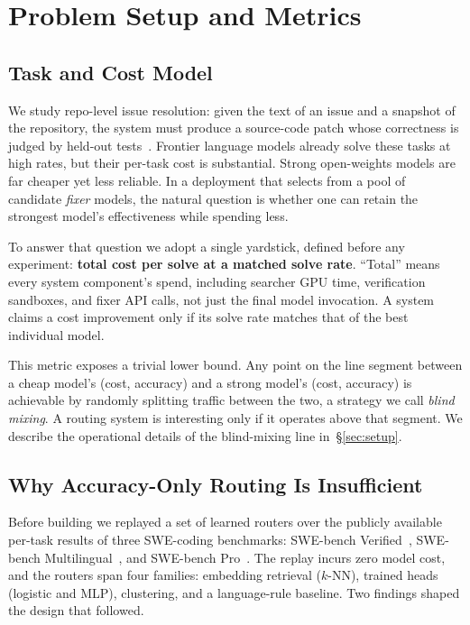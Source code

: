 \section{Problem Setup and Metrics}
\label{sec:problem}

\subsection{Task and Cost Model}
\label{sec:problem:task}

We study repo-level issue resolution: given the text of an issue and a
snapshot of the repository, the system must produce a source-code patch
whose correctness is judged by held-out tests~\citep{swebench,swebenchpro}.
Frontier language models already solve these tasks at high rates, but their
per-task cost is substantial.  Strong open-weights models are far cheaper
yet less reliable.  In a deployment that selects from a pool of candidate
\emph{fixer} models, the natural question is whether one can retain the
strongest model's effectiveness while spending less.

To answer that question we adopt a single yardstick, defined before any
experiment: \textbf{total cost per solve at a matched solve rate}.
``Total'' means every system component's spend, including searcher GPU
time, verification sandboxes, and fixer API calls, not just the final
model invocation.  A system claims a cost improvement only if its solve
rate matches that of the best individual model.

This metric exposes a trivial lower bound.  Any point on the line segment
between a cheap model's (cost, accuracy) and a strong model's (cost,
accuracy) is achievable by randomly splitting traffic between the two, a
strategy we call \emph{blind mixing}.  A routing system is interesting
only if it operates above that segment.  We describe the operational
details of the blind-mixing line in~\S\ref{sec:setup}.

\subsection{Why Accuracy-Only Routing Is Insufficient}
\label{sec:problem:audit}

Before building \sysname we replayed a set of learned routers over the
publicly available per-task results of three SWE-coding benchmarks:
SWE-bench Verified~\citep{swebenchverified}, SWE-bench
Multilingual~\citep{swebenchmultilingual}, and SWE-bench
Pro~\citep{swebenchpro}.  The replay incurs zero model cost, and the
routers span four families: embedding retrieval ($k$-NN), trained heads
(logistic and MLP), clustering, and a language-rule baseline.  Two
findings shaped the design that followed.


